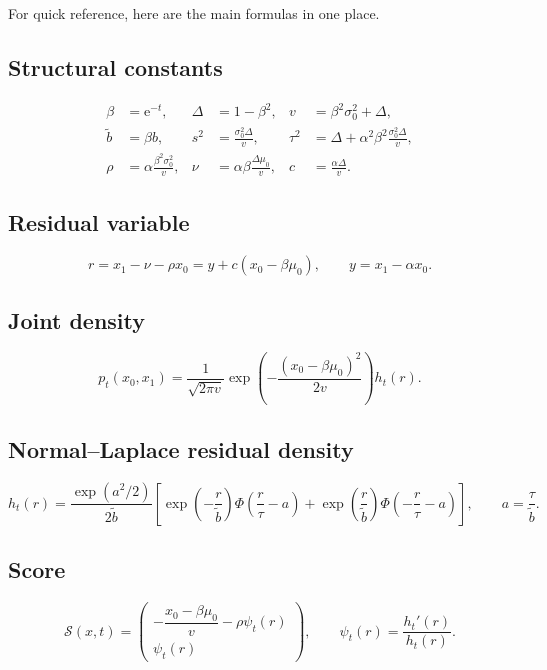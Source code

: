 \documentclass[11pt]{article}
\newcommand{\e}{\mathrm{e}}
\newcommand{\1}{\mathbf{1}}
\newcommand{\pt}{p_t}
\newcommand{\Ph}{\Phi}
\newcommand{\score}{\mathcal{S}}
\theoremstyle{definition}
\begin{document}
For quick reference, here are the main formulas in one place.

\subsection*{Structural constants}
\begin{align}
\beta &= \e^{-t}, & \Delta &= 1-\beta^2, & v &= \beta^2\sigma_0^2+\Delta, \\
\tilde b &= \beta b, & s^2 &= \frac{\sigma_0^2\Delta}{v}, & \tau^2 &= \Delta + \alpha^2\beta^2\frac{\sigma_0^2\Delta}{v}, \\
\rho &= \alpha\frac{\beta^2\sigma_0^2}{v}, & \nu &= \alpha\beta\frac{\Delta\mu_0}{v}, & c &= \frac{\alpha\Delta}{v}.
\end{align}

\subsection*{Residual variable}
\begin{equation}
r=x_1-\nu-\rho x_0 = y+c(x_0-\beta\mu_0),
\qquad y=x_1-\alpha x_0.
\end{equation}

\subsection*{Joint density}
\begin{equation}
\pt(x_0,x_1)=\frac{1}{\sqrt{2\pi v}}\exp\!\left(-\frac{(x_0-\beta\mu_0)^2}{2v}\right) h_t(r).
\end{equation}

\subsection*{Normal--Laplace residual density}
\begin{equation}
h_t(r)=\frac{\exp(a^2/2)}{2\tilde b}
\left[
\exp\!\left(-\frac{r}{\tilde b}\right)\Ph\!\left(\frac{r}{\tau}-a\right)
+
\exp\!\left(\frac{r}{\tilde b}\right)\Ph\!\left(-\frac{r}{\tau}-a\right)
\right],
\qquad a=\frac{\tau}{\tilde b}.
\end{equation}

\subsection*{Score}
\begin{equation}
\score(x,t)=
\begin{pmatrix}
-\dfrac{x_0-\beta\mu_0}{v} - \rho\psi_t(r)\\[0.8em]
\psi_t(r)
\end{pmatrix},
\qquad
\psi_t(r)=\frac{h_t'(r)}{h_t(r)}.
\end{equation}
\end{document}
